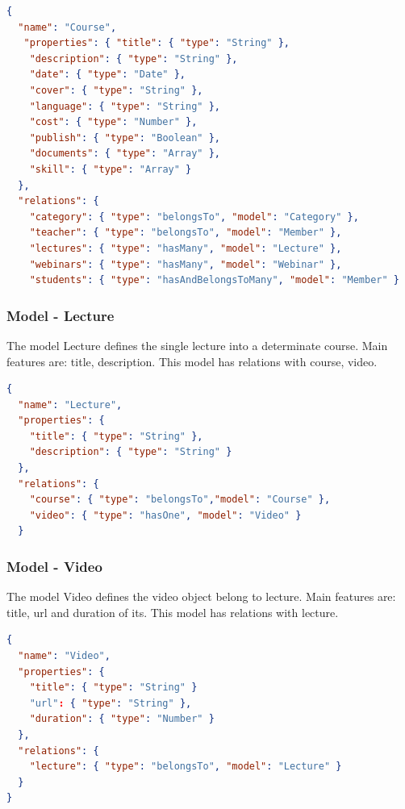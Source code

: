 \begin{lstlisting}[language=json]
{
  "name": "Course",
   "properties": { "title": { "type": "String" },
    "description": { "type": "String" },
    "date": { "type": "Date" },
    "cover": { "type": "String" },
    "language": { "type": "String" },
    "cost": { "type": "Number" },
    "publish": { "type": "Boolean" },
    "documents": { "type": "Array" },
    "skill": { "type": "Array" }
  },
  "relations": {
    "category": { "type": "belongsTo", "model": "Category" },
    "teacher": { "type": "belongsTo", "model": "Member" },
    "lectures": { "type": "hasMany", "model": "Lecture" },
    "webinars": { "type": "hasMany", "model": "Webinar" },
    "students": { "type": "hasAndBelongsToMany", "model": "Member" }

\end{lstlisting}

\subsubsection{ Model - Lecture}

The model Lecture defines the single lecture into a determinate course. Main features are: title, description. This model has relations with course, video.


\begin{lstlisting}[language=json]
{
  "name": "Lecture",
  "properties": {
    "title": { "type": "String" },
    "description": { "type": "String" }
  },
  "relations": {
    "course": { "type": "belongsTo","model": "Course" },
    "video": { "type": "hasOne", "model": "Video" }
  }

\end{lstlisting}

\subsubsection{ Model - Video}

The model Video defines the video object belong to lecture. Main features are: title, url and duration of its. This model has relations with lecture.


\begin{lstlisting}[language=json]
{
  "name": "Video",
  "properties": {
    "title": { "type": "String" }
    "url": { "type": "String" },
    "duration": { "type": "Number" }
  },
  "relations": {
    "lecture": { "type": "belongsTo", "model": "Lecture" }
  }
}

\end{lstlisting}


